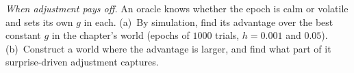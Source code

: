 \begin{exercise}[\lvlC]
\label{ex:08:7}
\emph{When adjustment pays off.} An oracle knows whether the epoch is calm or volatile and sets its own $g$ in each. (a)~By simulation, find its advantage over the best constant $g$ in the chapter's world (epochs of $1000$ trials, $h=0.001$ and $0.05$). (b)~Construct a world where the advantage is larger, and find what part of it surprise-driven adjustment captures.
\end{exercise}
